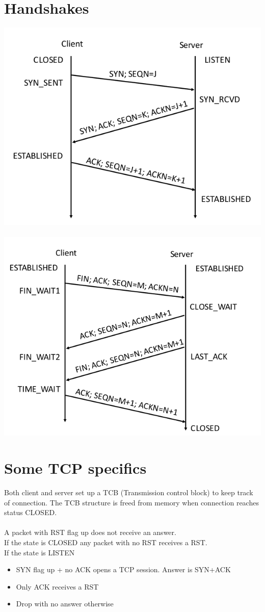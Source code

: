 \documentclass[10pt,a4paper]{book}
\begin{document}
\section{Handshakes}
\includegraphics[scale=0.5]{3-way.png}\\\\
\includegraphics[scale=0.5]{4-way.png}
\newpage
\section{Some TCP specifics}
Both client and server set up a TCB (Transmission control block) to keep track of connection. The TCB structure is freed from memory when connection reaches status CLOSED.\\\\
A packet with RST flag up does not receive an answer.\\
If the state is CLOSED any packet with no RST receives a RST.\\
If the state is LISTEN 
\begin{itemize}
\item SYN flag up + no ACK opens a TCP session. Answer is SYN+ACK
\item Only ACK receives a RST
\item Drop with no answer otherwise
\end{itemize}
\end{document}
